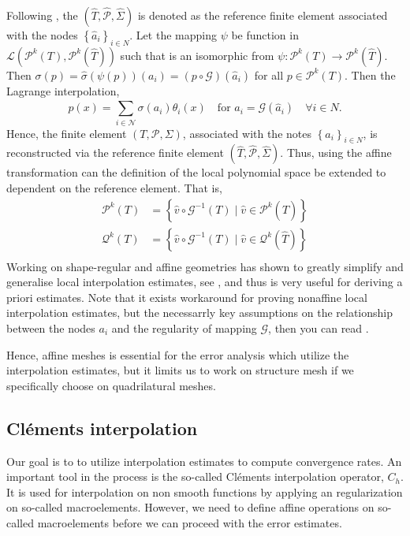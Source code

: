Following \cite[Example 9.4]{ErnGuermond2021}, the $ ( \hat{T}, \hat{\mathcal{P} }, \hat{\Sigma} ) $ is denoted as the reference finite element associated with the nodes $\left\{ \hat{a}_{i} \right\}_{i\in N} $. Let the mapping $\psi $ be function in $\mathcal{L}( \mathcal{P} ^{k}( T), \mathcal{P} ^{k}(\hat{T}
)  )  $ such that is an isomorphic from  $ \psi : \mathcal{P} ^{k}( T) \to \mathcal{P} ^{k}( \hat{T})   $.  Then $\sigma ( p) = \hat{\sigma }( \psi ( p) ) (a_{i} )  = ( p \circ \mathcal{G} )( \hat{a}_{i})      $ for all $p \in \mathcal{P}^{k}( T)  $.
Then the Lagrange interpolation,  \[
    p (x) = \sum_{i \in \mathcal{N} }^{} \sigma ( a_{i}) \theta_{i}( x) \quad \text{for } a_{i} = \mathcal{G}( \hat{a}_{i}) \quad  \forall i \in N     .
\]
Hence, the finite element $( T, \mathcal{P}, \Sigma  ) $, associated with the notes $\left\{ a_{i} \right\}_{i\in N} $, is reconstructed via the reference finite element $( \hat{T}, \hat{\mathcal{P} }, \hat{\Sigma} ) $.
Thus, using the affine transformation can the definition of the local polynomial space be extended to dependent on the reference element. That is, \[
    \begin{split}
\mathcal{P}^{k}( T) & = \left\{ \hat{v} \circ  \mathcal{G}^{-1}( T)   \mid  \hat{v} \in \mathcal{P}^{k}( \hat{T})      \right\} \\
\mathcal{Q}^{k}( T) & = \left\{ \hat{v} \circ  \mathcal{G}^{-1}( T)     \mid  \hat{v} \in \mathcal{Q}^{k}( \hat{T})      \right\} \\
    \end{split}
\]
Working on shape-regular and affine geometries has shown to greatly simplify and generalise local interpolation estimates, see \cite[Theorem 11.12]{ErnGuermond2021}, and thus is very useful for deriving a priori estimates. Note that it exists
workaround for proving nonaffine local interpolation estimates, but the necessarrly key assumptions on the relationship between the nodes $a_{i}$ and the regularity of mapping $\mathcal{G} $, then you can read \cite[Chapter 13]{ErnGuermond2021}.

Hence, affine meshes is essential for the error analysis which utilize the interpolation estimates, but it limits us to work on structure mesh if we specifically choose on quadrilatural meshes.


\subsection{Cléments interpolation}%
\label{ssub:clement_operator}
Our goal is to to utilize interpolation estimates to compute convergence rates. An important tool in the process is the so-called Cléments interpolation operator, $C_{h}$.
It is used for interpolation on non smooth functions by applying an regularization on so-called macroelements. However, we need to define affine operations on so-called macroelements before we can proceed with the error estimates.

